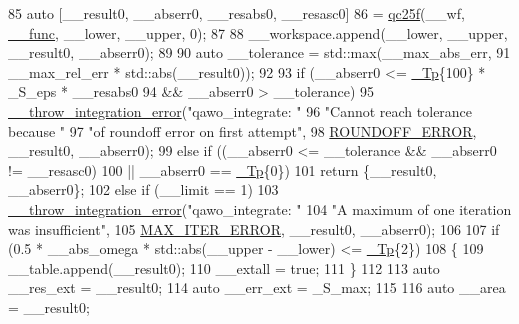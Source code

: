 \begin{DoxyCode}
85       \textcolor{keyword}{auto} [\_\_result0, \_\_abserr0, \_\_resabs0, \_\_resasc0]
86         = \hyperlink{namespace____gnu__cxx_a1362a6c4ef82cf1afe4de6bc66fb56b6}{qc25f}(\_\_wf, \hyperlink{namespace____gnu__cxx_af2b2f0c7a2ae72b922b1afefae5a65b2}{\_\_func}, \_\_lower, \_\_upper, 0);
87 
88       \_\_workspace.append(\_\_lower, \_\_upper, \_\_result0, \_\_abserr0);
89 
90       \textcolor{keyword}{auto} \_\_tolerance = std::max(\_\_max\_abs\_err,
91                                   \_\_max\_rel\_err * std::abs(\_\_result0));
92 
93       \textcolor{keywordflow}{if} (\_\_abserr0 <= \hyperlink{namespace____gnu__cxx_a3b19a9c800ca194374ef9172290f7d79}{\_Tp}\{100\} * \_S\_eps * \_\_resabs0
94           && \_\_abserr0 > \_\_tolerance)
95         \hyperlink{namespace____gnu__cxx_a2ae22137ca092b8ae10f4d42b4e32cfb}{\_\_throw\_integration\_error}(\textcolor{stringliteral}{"qawo\_integrate: "}
96                                   \textcolor{stringliteral}{"Cannot reach tolerance because "}
97                                   \textcolor{stringliteral}{"of roundoff error on first attempt"},
98                                   \hyperlink{namespace____gnu__cxx_ad6c62dd86a596716cece6ac2d4cfd4b3a29574de87143c7715e9a138d7340e8ae}{ROUNDOFF\_ERROR}, \_\_result0, \_\_abserr0);
99       \textcolor{keywordflow}{else} \textcolor{keywordflow}{if} ((\_\_abserr0 <= \_\_tolerance && \_\_abserr0 != \_\_resasc0)
100                 || \_\_abserr0 == \hyperlink{namespace____gnu__cxx_a3b19a9c800ca194374ef9172290f7d79}{\_Tp}\{0\})
101         \textcolor{keywordflow}{return} \{\_\_result0, \_\_abserr0\};
102       \textcolor{keywordflow}{else} \textcolor{keywordflow}{if} (\_\_limit == 1)
103         \hyperlink{namespace____gnu__cxx_a2ae22137ca092b8ae10f4d42b4e32cfb}{\_\_throw\_integration\_error}(\textcolor{stringliteral}{"qawo\_integrate: "}
104                                   \textcolor{stringliteral}{"A maximum of one iteration was insufficient"},
105                                   \hyperlink{namespace____gnu__cxx_ad6c62dd86a596716cece6ac2d4cfd4b3a420d46d10205dd953d0ccce5323afc4c}{MAX\_ITER\_ERROR}, \_\_result0, \_\_abserr0);
106 
107       \textcolor{keywordflow}{if} (0.5 * \_\_abs\_omega * std::abs(\_\_upper - \_\_lower) <= \hyperlink{namespace____gnu__cxx_a3b19a9c800ca194374ef9172290f7d79}{\_Tp}\{2\})
108         \{
109           \_\_table.append(\_\_result0);
110           \_\_extall = \textcolor{keyword}{true};
111         \}
112 
113       \textcolor{keyword}{auto} \_\_res\_ext = \_\_result0;
114       \textcolor{keyword}{auto} \_\_err\_ext = \_S\_max;
115 
116       \textcolor{keyword}{auto} \_\_area = \_\_result0;

\end{DoxyCode}
